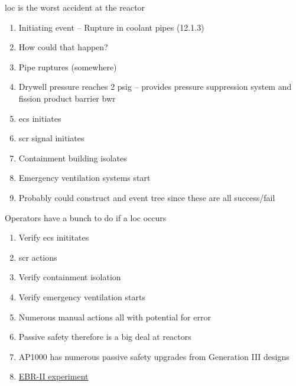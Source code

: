 \documentclass[aspectratio=1610,pdftex,dvipsnames,compress,xcolor={dvipsnames}]{beamer}
\newcommand{\acf}{\acrfull} %
\newcommand{\acs}{\acrshort} %
\begin{document}
\addtocounter{framenumber}{-1}
\begin{frame}{\acs{loc} is the worst accident at the reactor}
    \begin{enumerate}[series=outerlist,topsep=0pt,itemsep=7pt,leftmargin=*,label=(\arabic*)]
        \item[]Initiating event -- Rupture in coolant pipes (12.1.3)
        \item[]How could that happen?
        \item[]Pipe ruptures (somewhere)
        \item[]Drywell pressure reaches 2 psig -- provides pressure suppression system and fission product barrier \acs{bwr}
        \item[]\acf{ecs} initiates
        \item[]\acs{scr} signal initiates 
        \item[]Containment building isolates  
        \item[]Emergency ventilation systems start
        \item[]Probably could construct and event tree since these are all success/fail
    \end{enumerate}
\end{frame}


\begin{frame}{Operators have a bunch to do if a \acs{loc} occurs}
    \begin{enumerate}[series=outerlist,topsep=0pt,itemsep=13pt,leftmargin=*,label=(\arabic*)]
        \item[]Verify \acs{ecs} inititates
        \item[]\acs{scr} actions
        \item[]Verify containment isolation
        \item[]Verify emergency ventilation starts
        \item[]Numerous manual actions all with potential for error
        \item[]Passive safety therefore is a big deal at reactors
        \item[]AP1000 has numerous passive safety upgrades from Generation III designs
        \item[]\href{https://uidaho.pressbooks.pub/nuclearengineering/chapter/front-end-of-the-fuel-cycle-2/}{EBR-II experiment}
    \end{enumerate}
\end{frame}
\end{document}
